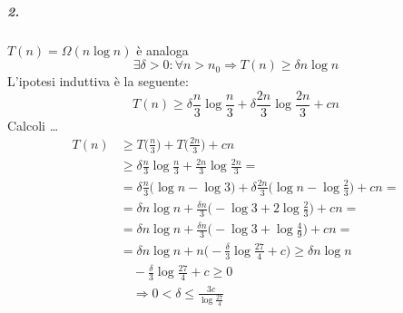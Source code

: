 \subparagraph{2.} $T(n) = \Omega (n \log n)$ è analoga %
$$\exists \delta > 0 : \forall n > n_0 \Rightarrow T(n) \geq \delta n \log n $$
L'ipotesi induttiva è la seguente:
\[ 
	T(n) \geq \delta \frac{n}{3} \log \frac{n}{3} + \delta \frac{2n}{3} \log \frac{2n}{3} + cn
\]
Calcoli \dots
\begin{align*}
	T(n) & \geq T\Big(\frac{n}{3} \Big) + T\Big(\frac{2n}{3} \Big) + cn \\
	& \geq \delta \frac{n}{3} \log \frac{n}{3} + \frac{2n}{3} \log \frac{2n}{3} = \\
	& = \delta \frac{n}{3} \Big(\log n - \log 3 \Big) + \delta \frac{2n}{3} \Big(\log n - \log \frac{2}{3} \Big) + cn = \\
	& = \delta n \log n + \frac{\delta n}{3} \Big( - \log 3 + 2 \log \frac{2}{3} \Big) + cn = \\
	& = \delta n \log n + \frac{\delta n}{3} \Big( - \log 3 + \log \frac{4}{9} \Big) + cn = \\
	& = \delta n \log n + n \Big( - \frac{\delta}{3} \log \frac{27}{4} + c \Big) \geq \delta n \log n\\
	& \quad - \frac{\delta}{3} \log \frac{27}{4} + c \geq 0 \\
	& \quad \Rightarrow 0 < \delta \leq \frac{3c}{\log \frac{27}{4}}
\end{align*}